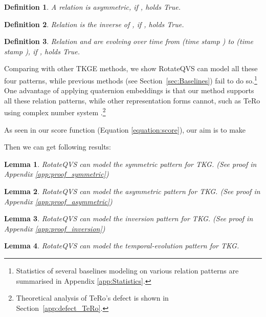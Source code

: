 \documentclass[11pt]{article}
\newtheorem{myDef}{Definition}
\newcommand{\secref}[1]{Section~\ref{#1}\xspace}
\newtheorem{lemma}{Lemma}
\begin{document}
\begin{myDef}
	\label{definition:r2}
    A relation  is asymmetric, if ,   holds True.
\end{myDef}

\begin{myDef}
	\label{definition:r3}
    Relation  is the inverse of , if ,    holds True.
\end{myDef}

\begin{myDef}
	\label{definition:r4}
    Relation  and  are evolving over time from  (time stamp ) to  (time stamp ), if ,   holds True.
\end{myDef}




Comparing with other TKGE methods, we show RotateQVS can model all these four patterns, while previous methods (see \secref{sec:Baselines}) fail to do so.\footnote{
Statistics of several baselines modeling on various relation patterns are summarised in Appendix \ref{app:Statistics}.}
One advantage of applying quaternion embeddings is that our method supports all these relation patterns, while other representation forms cannot, such as TeRo \cite{xu2020tero} using complex number system .\footnote{Theoretical analysis of TeRo's defect is shown in Section~\ref{app:defect_TeRo}.}

As seen in our score function (Equation \ref{equation:score}), our aim is to make 

Then we can get following results:

\begin{lemma}\label{lemma:symmetric}
RotateQVS can model the symmetric pattern for TKG. (See proof in Appendix \ref{app:proof_symmetric})
\end{lemma}

\begin{lemma}\label{lemma:asymmetric}
RotateQVS can model the asymmetric pattern for TKG. (See proof in Appendix \ref{app:proof_asymmetric})
\end{lemma}

\begin{lemma}\label{lemma:inversion}
RotateQVS can model the inversion pattern for TKG. (See proof in Appendix \ref{app:proof_inversion})
\end{lemma}

\begin{lemma}\label{lemma:temporal-evolution}
RotateQVS can model the temporal-evolution pattern for TKG.
\end{lemma}
\end{document}

